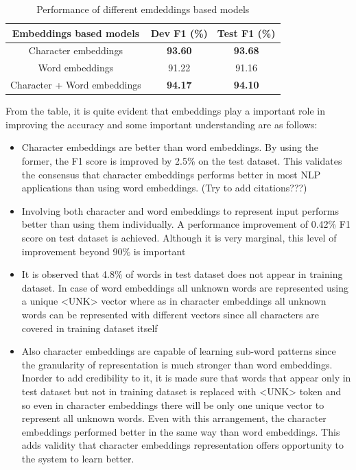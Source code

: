 \documentclass[a4paper, 11pt]{article}
\begin{document}
\begin{table}[h!]
  \begin{center}
    \label{tab:different_embeddings_model}
    \def\arraystretch{1.5}%
    \begin{tabular}{c|c|c}
      Embeddings based models & Dev F1 (\%) & Test F1 (\%) \\
      \hline
      Character embeddings & \textbf{93.60} & \textbf{93.68}\\
      Word embeddings  & 91.22 & 91.16\\
      Character + Word embeddings & \textbf{94.17} & \textbf{94.10}\\
    \end{tabular}
    \caption{Performance of different emdeddings based models }
  \end{center}
\end{table}


From the table, it is quite evident that embeddings play a important role in improving the accuracy and some important understanding are as follows:
\begin{itemize}
\item Character embeddings are better than word embeddings. By using the former, the F1 score is improved by 2.5\% on the test dataset. This validates the consensus that character embeddings performs better in most NLP applications than using word embeddings. (Try to add citations???)
\item Involving both character and word embeddings to represent input performs better than using them individually. A performance improvement of 0.42\% F1 score on test dataset is achieved. Although it is very marginal, this level of improvement beyond 90\% is important
\item It is observed that 4.8\% of words in test dataset does not appear in training dataset. In case of word embeddings all unknown words are represented using a unique <UNK> vector where as in character embeddings all unknown words can be represented with different vectors since all characters are covered in training dataset itself
\item Also character embeddings are capable of learning sub-word patterns since the granularity of representation is much stronger than word embeddings. Inorder to add credibility to it, it is made sure that words that appear only in test dataset but not in training dataset is replaced with <UNK> token and so even in character embeddings there will be only one unique vector to represent all unknown words. Even with this arrangement, the character embeddings performed better in the same way than word embeddings. This adds validity that character embeddings representation offers opportunity to the system to learn better. 
\end{itemize}
\end{document}
